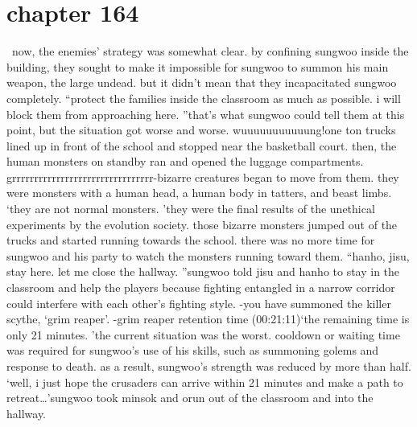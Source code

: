\section{chapter 164}






 now, the enemies’ strategy was somewhat clear.
 by confining sungwoo inside the building, they sought to make it impossible for sungwoo to summon his main weapon, the large undead.
but it didn’t mean that they incapacitated sungwoo completely.
“protect the families inside the classroom as much as possible.
 i will block them from approaching here.
”that’s what sungwoo could tell them at this point, but the situation got worse and worse.
wuuuuuuuuuuung!one ton trucks lined up in front of the school and stopped near the basketball court.
then, the human monsters on standby ran and opened the luggage compartments.
grrrrrrrrrrrrrrrrrrrrrrrrrrrrrrrr-bizarre creatures began to move from them.
 they were monsters with a human head, a human body in tatters, and beast limbs.
‘they are not normal monsters.
’they were the final results of the unethical experiments by the evolution society.
those bizarre monsters jumped out of the trucks and started running towards the school.
there was no more time for sungwoo and his party to watch the monsters running toward them.
“hanho, jisu, stay here.
 let me close the hallway.
”sungwoo told jisu and hanho to stay in the classroom and help the players because fighting entangled in a narrow corridor could interfere with each other’s fighting style.
-you have summoned the killer scythe, ‘grim reaper’.
-grim reaper retention time (00:21:11)‘the remaining time is only 21 minutes.
’the current situation was the worst.
 cooldown or waiting time was required for sungwoo’s use of his skills, such as summoning golems and response to death.
 as a result, sungwoo’s strength was reduced by more than half.
‘well, i just hope the crusaders can arrive within 21 minutes and make a path to retreat…’sungwoo took minsok and orun out of the classroom and into the hallway.

